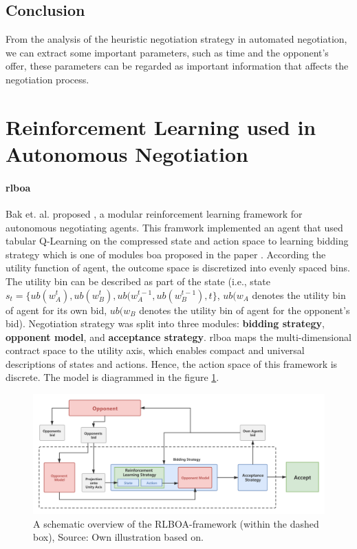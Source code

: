 \subsection{Conclusion}
From the analysis of the heuristic negotiation strategy in automated negotiation, we can extract some important parameters, such as time and the opponent's offer, these parameters can be regarded as important information that affects the negotiation process.

\section{Reinforcement Learning used in Autonomous Negotiation}

\paragraph{\gls{rlboa}} Bak et. al. proposed \parencite{Bakker2019RLBOAAM}, a modular reinforcement learning framework for autonomous negotiating agents. This framwork implemented an agent that used tabular Q-Learning on the compressed state and action space to learning bidding strategy which is one of modules \gls{boa} proposed in the paper \parencite{Baarslag2014}. According the utility function of agent, the outcome space is discretized into evenly spaced bins. The utility bin can be described as part of the state (i.e., state $s_t = \{ ub(w_{A}^t), ub(w_{B}^t), ub(w_{A}^{t-1}, ub(w_{B}^{t-1}), t\}$, $ub(w_{A}$ denotes the utility bin of agent for its own bid, $ub(w_{B}$ denotes the utility bin of agent for the opponent's bid). Negotiation strategy was split into three modules: \textbf{bidding strategy}, \textbf{opponent model}, and \textbf{acceptance strategy}. \gls{rlboa} maps the multi-dimensional contract space to the utility axis, which enables compact and universal descriptions of states and actions. Hence, the action space of this framework is discrete. The model is diagrammed in the figure \ref{fig:rlboa}.

\begin{figure}[htbp]
\centering
\includegraphics[width=1.0\textwidth]{./images/rlboa.png}
\caption{A schematic overview of the RLBOA-framework (within the dashed box), Source: Own illustration based
on\parencite{Bakker2019RLBOAAM}.}
\label{fig:rlboa}
\end{figure}


